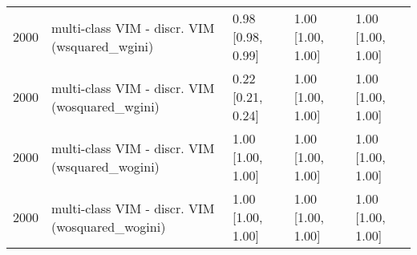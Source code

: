 \begin{table}[ht]
\begin{tabular}{rllll}
  2000 & multi-class VIM - discr. VIM (wsquared\_wgini) & 0.98 [0.98, 0.99] & 1.00 [1.00, 1.00] & 1.00 [1.00, 1.00] \\ 
  2000 & multi-class VIM - discr. VIM (wosquared\_wgini) & 0.22 [0.21, 0.24] & 1.00 [1.00, 1.00] & 1.00 [1.00, 1.00] \\ 
  2000 & multi-class VIM - discr. VIM (wsquared\_wogini) & 1.00 [1.00, 1.00] & 1.00 [1.00, 1.00] & 1.00 [1.00, 1.00] \\ 
  2000 & multi-class VIM - discr. VIM (wosquared\_wogini) & 1.00 [1.00, 1.00] & 1.00 [1.00, 1.00] & 1.00 [1.00, 1.00] \\ 
   \hline
\end{tabular}
\end{table}
